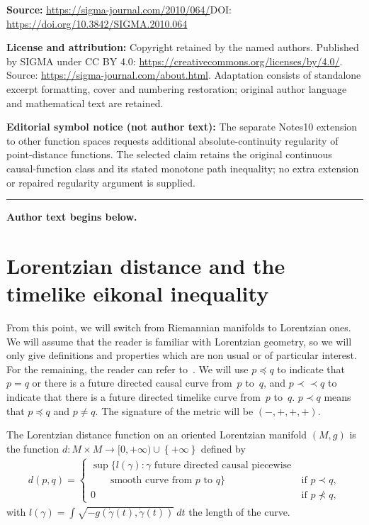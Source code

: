 \documentclass[11pt]{article}
\newcommand{\set}[1]{\left\{ {#1} \right\}}
\newcommand{\precc}{\prec\!\!\prec}
\begin{document}
\noindent\textbf{Source:} \url{https://sigma-journal.com/2010/064/}\quad DOI: \url{https://doi.org/10.3842/SIGMA.2010.064}\par
\noindent\textbf{License and attribution:} Copyright retained by the named authors. Published by SIGMA under CC BY 4.0: \url{https://creativecommons.org/licenses/by/4.0/}. Source: \url{https://sigma-journal.com/about.html}. Adaptation consists of standalone excerpt formatting, cover and numbering restoration; original author language and mathematical text are retained.\par
\noindent\textbf{Editorial symbol notice (not author text):} The separate Notes10 extension to other function spaces requests additional absolute-continuity regularity of point-distance functions. The selected claim retains the original continuous causal-function class and its stated monotone path inequality; no extra extension or repaired regularity argument is supplied.\par
\medskip\hrule\medskip\noindent\textbf{Author text begins below.}\par
\setcounter{section}{2}
\setcounter{subsection}{0}
\setcounter{subsubsection}{0}
\setcounter{equation}{0}
\section{Lorentzian distance and the timelike eikonal inequality}

From this point, we will switch from Riemannian manifolds to Lorentzian ones. We will assume that the reader is familiar with Lorentzian geometry, so we will only give def\/initions and pro\-per\-ties which are non usual or of particular interest. For the remaining, the reader can refer to~\cite{Beem,ONeill}. We will use $p \preceq q$ to indicate that $p = q$ or there is a future directed causal curve from~$p$ to~$q$, and $p \precc q$ to indicate that there is a future directed timelike curve from~$p$ to~$q$. $p \prec q$ means that $p \preceq q$ and $p\neq q$. The signature of the metric will be $(-,+,+,+)$.

\begin{definition}
The Lorentzian distance function on an oriented Lorentzian manifold $(M,g)$ is the function $d : M \times M \rightarrow [0,+\infty) \cup \set{+\infty}$ def\/ined by
\begin{gather*}
d(p,q) =
\begin{cases}
 \sup\{ l(\gamma) : \gamma \text{ future directed causal piecewise} \ & \ \\
  \qquad \text{smooth curve from $p$ to $q$}\} &\text{if } p \prec q,\\
 0 &\text{if } p \nprec q,
\end{cases}
 \end{gather*}
 with $l(\gamma) = \int \sqrt{ -g( \dot\gamma(t) ,  \dot\gamma(t) )}\ dt$ the length of the curve.
\end{definition}
\end{document}
